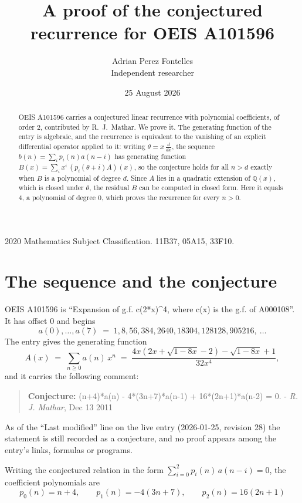 \documentclass[11pt,a4paper]{article}
\title{A proof of the conjectured recurrence for OEIS A101596}
\author{Adrian Perez Fontelles\\ \small Independent researcher}
\date{25 August 2026}
\theoremstyle{plain}
\theoremstyle{definition}
\begin{document}
\maketitle

\begin{abstract}
OEIS A101596 carries a conjectured linear recurrence with polynomial coefficients, of
order 2, contributed by R.~J.~Mathar. We prove it. The generating function of the
entry is algebraic, and the recurrence is equivalent to the vanishing of an explicit
differential operator applied to it: writing $\theta=x\,\frac{d}{dx}$, the sequence
$b(n)=\sum_{i}p_{i}(n)a(n-i)$ has generating function
$B(x)=\sum_{i}x^{i}\,(p_{i}(\theta+i)A)(x)$, so the conjecture holds for all $n>d$ exactly
when $B$ is a polynomial of degree $d$. Since $A$ lies in a quadratic extension of
$\mathbb{Q}(x)$, which is closed under $\theta$, the residual $B$ can be computed in
closed form. Here it equals $4$, a polynomial of degree $0$, which proves
the recurrence for every $n>0$.
\end{abstract}

\noindent\small 2020 Mathematics Subject Classification. 11B37, 05A15, 33F10.\normalsize

\section{The sequence and the conjecture}

OEIS A101596 is ``Expansion of g.f. c(2*x)\^{}4, where c(x) is the g.f. of A000108''. It has offset $0$ and begins
\[
a(0),\dots,a(7)\;=\;1, 8, 56, 384, 2640, 18304, 128128, 905216,\ \dots
\]
The entry gives the generating function
\begin{equation}\label{eq:gf}
A(x)\;=\;\sum_{n\ge 0} a(n)\,x^{n}\;=\;\frac{4 x \left(2 x + \sqrt{1 - 8 x} - 2\right) - \sqrt{1 - 8 x} + 1}{32 x^{4}} ,
\end{equation}
and it carries the following comment:
\begin{quote}\small
\textbf{Conjecture:} (n+4)*a(n) - 4*(3n+7)*a(n-1) + 16*(2n+1)*a(n-2) = 0. - \emph{R. J. Mathar}, Dec 13 2011
\end{quote}
As of the ``Last modified'' line on the live entry (2026-01-25, revision 28) the
statement is still recorded as a conjecture, and no proof appears among the entry's links,
formulas or programs.

Writing the conjectured relation in the form $\sum_{i=0}^{2}p_{i}(n)\,a(n-i)=0$,
the coefficient polynomials are
\[
p_{0}(n)=n + 4,\qquad p_{1}(n)=- 4 \left(3 n + 7\right),\qquad p_{2}(n)=16 \left(2 n + 1\right)
\]
\end{document}
